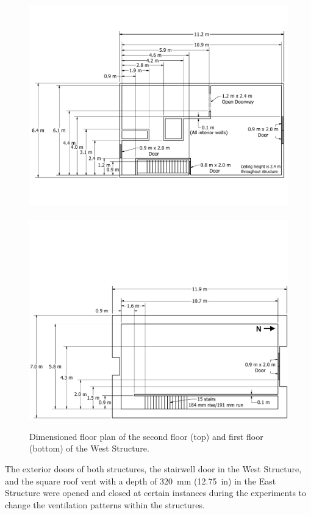 \begin{figure}[!h]
	\centering
	\includegraphics[width=\columnwidth]{Figures/Floor_Plans/West_Structure_2nd_Floor_Dimensioned_Full}
	\\~\\
	\includegraphics[width=\columnwidth]{Figures/Floor_Plans/West_Structure_1st_Floor_Dimensioned_Full}
	\caption[Dimensioned floor plans of the West Structure]{Dimensioned floor plan of the second floor (top) and first floor (bottom) of the West Structure.}
	\label{fig:west_dimensioned_plan}
\end{figure}

The exterior doors of both structures, the stairwell door in the West Structure, and the square roof vent with a depth of 320~mm (12.75~in) in the East Structure were opened and closed at certain instances during the experiments to change the ventilation patterns within the structures.

